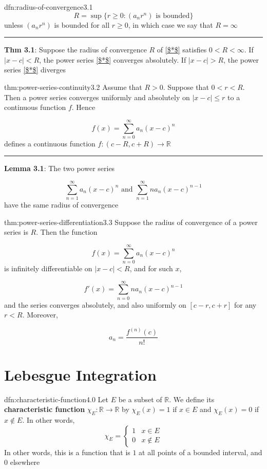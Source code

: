 \documentclass[landscape, 8pt]{extarticle}
\begin{document}
\begin{multicols}{3}
\begin{dfn}{dfn:radius-of-convergence}{3.1}
	\[R=\sup\{r\ge 0:(a_{n}r^n) \text{ is bounded}\}\]
	unless $(a_{n}r^{n})$ is bounded for all $r\ge 0$, in which case we say that $R=\infty$

	\noindent\rule{\textwidth}{0.2pt}

	\textbf{Thm 3.1}: Suppose the radius of convergence $R$ of \ref{$*$} satisfies $0<R<\infty$. If $\lvert x-c \rvert<R$, the power series \ref{$*$} converges absolutely. If $\lvert x-c \rvert>R$, the power series \ref{$*$} diverges
\end{dfn}

\begin{thm}{thm:power-series-continuity}{3.2}
	Assume that $R>0$. Suppose that $0<r<R$. Then a power series converges uniformly and absolutely on $\lvert x-c \rvert\le r$ to a continuous function $f$. Hence

	\[f(x)=\sum_{n=0}^{\infty} a_{n}(x-c)^{n}\]
	defines a continuous function $f:(c-R,c+R)\to \mathbb{R}$

	\noindent\rule{\textwidth}{0.2pt}
	\textbf{Lemma 3.1}: The two power series

	\[\sum_{n=1}^{\infty} a_{n}(x-c)^{n}\text{ and } \sum_{n=1}^{\infty} na_{n}(x-c)^{n-1}\]
	have the same radius of convergence
\end{thm}

\begin{thm}{thm:power-series-differentiation}{3.3}
	Suppose the radius of convergence of a power series is $R$. Then the function

	\[f(x)=\sum_{n=0}^{\infty} a_{n}(x-c)^{n}\]
	is infinitely differentiable on $\lvert x-c \rvert<R$, and for such $x$,

	\[f'(x)=\sum_{n=0}^{\infty} na_{n}(x-c)^{n-1}\]
	and the series converges absolutely, and also uniformly on $[c-r,c+r]$ for any $r<R$. Moreover,

	\[a_{n}=\frac{f^{(n)}(c)}{n!}\]
\end{thm}



\newpage
\section{Lebesgue Integration}

\begin{dfn}{dfn:characteristic-function}{4.0}
	Let $E$ be a subset of $\mathbb{R}$. We define its \textbf{characteristic function} $\chi_{E}:\mathbb{R}\to\mathbb{R}$ by $\chi_{E}(x)=1$ if $x\in E$ and $\chi_{E}(x)=0$ if $x\not\in E$. In other words,
	\[\chi_{E}=\begin{cases}
	1&x\in E \\
	0 & x\not\in E
	\end{cases}\]
	In other words, this is a function that is $1$ at all points of a bounded interval, and $0$ elsewhere


\end{dfn}
\end{multicols}
\end{document}
